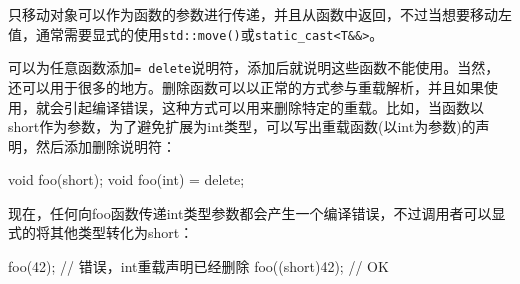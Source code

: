只移动对象可以作为函数的参数进行传递，并且从函数中返回，不过当想要移动左值，通常需要显式的使用\texttt{std::move()}或\texttt{static\_cast<T\&\&>}。

可以为任意函数添加\texttt{= delete}说明符，添加后就说明这些函数不能使用。当然，还可以用于很多的地方。删除函数可以以正常的方式参与重载解析，并且如果使用，就会引起编译错误，这种方式可以用来删除特定的重载。比如，当函数以short作为参数，为了避免扩展为int类型，可以写出重载函数(以int为参数)的声明，然后添加删除说明符：

\begin{cpp}
void foo(short);
void foo(int) = delete;
\end{cpp}

现在，任何向foo函数传递int类型参数都会产生一个编译错误，不过调用者可以显式的将其他类型转化为short：

\begin{cpp}
foo(42);  // 错误，int重载声明已经删除
foo((short)42);  // OK
\end{cpp}

